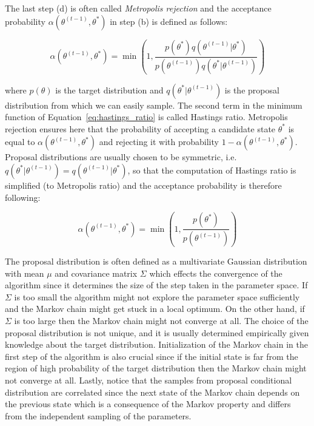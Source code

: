 The last step (d) is often called \textit{Metropolis rejection} and the acceptance probability $\alpha(\theta^{(t-1)},\theta^*)$ in step (b) is defined as follows:

\begin{equation} \label{eq:hastings_ratio}
    \alpha(\theta^{(t-1)},\theta^*) = \min \left(1,\frac{p(\theta^*)q(\theta^{(t-1)}|\theta^*)}{p(\theta^{(t-1)})q(\theta^*|\theta^{(t-1)})}\right)
\end{equation}

where $p(\theta)$ is the target distribution and $q(\theta^*|\theta^{(t-1)})$ is the proposal distribution from which we can easily sample.
The second term in the minimum function of Equation~\ref{eq:hastings_ratio} is called Hastings ratio. Metropolis rejection ensures here that 
the probability of accepting a candidate state $\theta^*$ is equal to $\alpha(\theta^{(t-1)},\theta^*)$ and rejecting it with probability $1 - \alpha(\theta^{(t-1)},\theta^*)$.
Proposal distributions are usually chosen to be symmetric, i.e. $q(\theta^*|\theta^{(t-1)}) = q(\theta^{(t-1)}|\theta^*)$, 
so that the computation of Hastings ratio is simplified (to Metropolis ratio) and the acceptance probability is therefore following:

\begin{equation}
    \alpha(\theta^{(t-1)},\theta^*) = \min \left(1,\frac{p(\theta^*)}{p(\theta^{(t-1)})}\right)
\end{equation}

The proposal distribution is often defined as a multivariate Gaussian distribution with mean $\mu$ and covariance matrix $\Sigma$ which effects the convergence of the algorithm since it determines the size of the step taken in the parameter space. 
If $\Sigma$ is too small the algorithm might not explore the parameter space sufficiently and the Markov chain might get stuck in a local optimum. On the other hand, if $\Sigma$ is too large then the Markov chain might not converge at all. 
The choice of the proposal distribution is not unique, and it is usually determined empirically given knowledge about the target distribution. 
Initialization of the Markov chain in the first step of the algorithm is also crucial since if the initial state is far from the region of high probability of the target distribution then the Markov chain might not converge at all.
Lastly, notice that the samples from proposal conditional distribution are correlated since the next state of the Markov chain depends on the previous state which is a consequence of the Markov property and differs from the independent sampling of the parameters.~\citep{Mikusheva2007}

